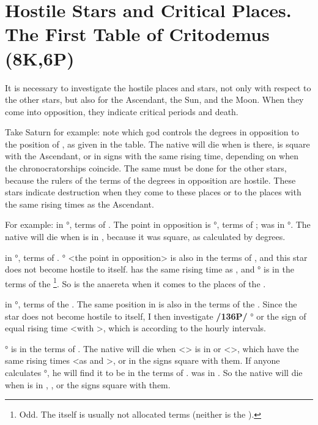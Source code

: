 \section{Hostile Stars and Critical Places. The First Table of Critodemus (8K,6P)}

It is necessary to investigate the hostile places and stars, not only with respect to the other stars, but also for the Ascendant, the Sun, and the Moon. When they come into opposition, they indicate critical periods and death. 

Take Saturn for example: note which god controls the degrees in opposition to the position of \Saturn, as given in the table. The native will die when \Saturn\xspace is there, is square with the Ascendant, or in signs with the same rising time, depending on when the chronocratorships coincide. The
same must be done for the other stars, because the rulers of the terms of the degrees in opposition are hostile. These stars indicate destruction when they come to these places or to the places with the same rising times as the Ascendant.

For example: \Saturn\xspace in \Cancer\xspace 21°, terms of \Venus. The point in opposition is \Capricorn\xspace 21°, terms
of \Mars; \Mars\xspace was in \Taurus\xspace 27°. The native will die when \Saturn\xspace is in \Virgo, because it was square, as calculated by degrees.

\Jupiter\xspace in \Scorpio\xspace 14°, terms of \Saturn. \Taurus\xspace 14° <the point in opposition> is also in the terms of \Saturn, and this star does not become hostile to itself. \Leo\xspace has the same rising time as \Scorpio, and \Leo\xspace 14° is in the terms of the \Sun\footnote{Odd. The \Sun\xspace itself is usually not allocated terms (neither is the \Moon).}. So \Jupiter\xspace is the anaereta when it comes to the places of the \Sun.

\Mars\xspace in \Taurus\xspace 27°, terms of the \Sun. The same position in \Scorpio\xspace <the point in opposition> is also in the terms of the \Sun. Since the star does not become hostile to itself, I then investigate \textbf{/136P/} \Leo\xspace 27° or the sign of equal rising time <with \Taurus>, which is \Gemini\xspace according to the hourly intervals.

\Gemini\xspace 27° is in the terms of \Venus. The native will die when <\Mars> is in \Scorpio\xspace or <\Pisces>, which have the same rising times <as \Leo\xspace and \Taurus>, or in the signs square with them. If anyone calculates \Leo\xspace 27°, he will find it to be in the terms of \Saturn. \Saturn\xspace was in \Cancer. So the native will die when \Mars\xspace is in \Cancer, \Sagittarius, or the signs square with them.

